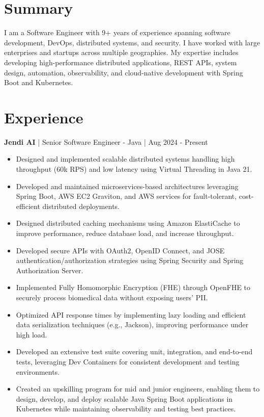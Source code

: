 \documentclass{resume} %
\begin{document}
\section{Summary}
I am a Software Engineer with 9+ years of experience spanning software development, DevOps, distributed systems, and security. I have worked with large enterprises and startups across multiple geographies. My expertise includes developing high-performance distributed applications, REST APIs, system design, automation, observability, and cloud-native development with Spring Boot and Kubernetes.

\section{Experience}
\textbf{Jendi AI} | Senior Software Engineer - Java | Aug 2024 - Present
\begin{itemize}
    \item Designed and implemented scalable distributed systems handling high throughput (60k RPS) and low latency using Virtual Threading in Java 21.
    \item Developed and maintained microservices-based architectures leveraging Spring Boot, AWS EC2 Graviton, and AWS services for fault-tolerant, cost-efficient distributed deployments.
    \item Designed distributed caching mechanisms using Amazon ElastiCache to improve performance, reduce database load, and increase throughput.
    \item Developed secure APIs with OAuth2, OpenID Connect, and JOSE authentication/authorization strategies using Spring Security and Spring Authorization Server.
    \item Implemented Fully Homomorphic Encryption (FHE) through OpenFHE to securely process biomedical data without exposing users' PII.
    \item Optimized API response times by implementing lazy loading and efficient data serialization techniques (e.g., Jackson), improving performance under high load.
    \item Developed an extensive test suite covering unit, integration, and end-to-end tests, leveraging Dev Containers for consistent development and testing environments.
    \item Created an upskilling program for mid and junior engineers, enabling them to design, develop, and deploy scalable Java Spring Boot applications in Kubernetes while maintaining observability and testing best practices.
\end{itemize}
\end{document}
